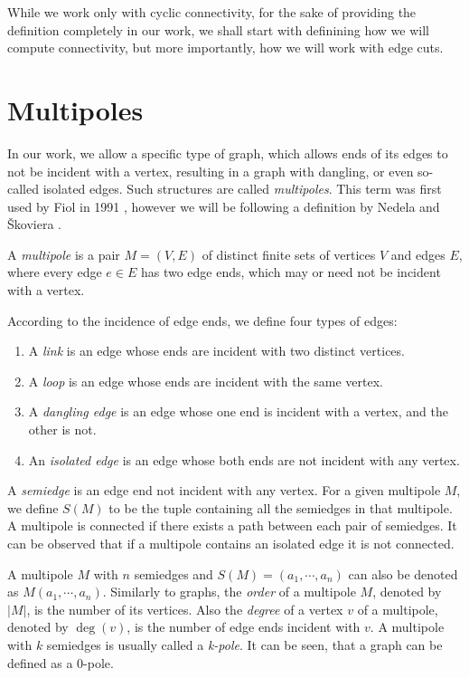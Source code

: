 \documentclass[12pt, twoside]{book}
\begin{document}
While we work only with cyclic connectivity, for the sake of providing the definition completely in our work, we shall start with definining how we will compute connectivity, but more importantly, how we will work with edge cuts.

\section{Multipoles}\label{sec:multipoles}

In our work, we allow a specific type of graph, which allows ends of its edges to not be incident with a vertex, resulting in a graph with dangling, or even so-called isolated edges. Such structures are called \textit{multipoles}. This term was first used by Fiol in 1991 \cite{Fiol1991}, however we will be following a definition by Nedela and Škoviera \cite{Nedela1996}.

\begin{definition}
	A \textit{multipole} is a pair $M=(V,E)$ of distinct finite sets of vertices $V$ and edges $E$, where every edge $e\in E$ has two edge ends, which may or need not be incident with a vertex.
	
	According to the incidence of edge ends, we define four types of edges:
	\begin{enumerate}[nolistsep]
		\item A \textit{link} is an edge whose ends are incident with two distinct vertices.
		\item A \textit{loop} is an edge whose ends are incident with the same vertex.
		\item A \textit{dangling edge} is an edge whose one end is incident with a vertex, and the other is not.
		\item An \textit{isolated edge} is an edge whose both ends are not incident with any vertex.
	\end{enumerate}
\end{definition}

A \textit{semiedge} is an edge end not incident with any vertex. For a given multipole $M$, we define $S(M)$ to be the tuple containing all the semiedges in that multipole. A multipole is connected if there exists a path between each pair of semiedges. It can be observed that if a multipole contains an isolated edge it is not connected.

A multipole $M$ with $n$ semiedges and $S(M) = (a_1, \cdots, a_n)$ can also be denoted as $M(a_1,\cdots,a_n)$. Similarly to graphs, the \textit{order} of a multipole $M$, denoted by $|M|$, is the number of its vertices. Also the \textit{degree} of a vertex $v$ of a multipole, denoted by $\deg(v)$, is the number of edge ends incident with $v$. A multipole with $k$ semiedges is usually called a \textit{k-pole}. It can be seen, that a graph can be defined as a 0-pole.
\end{document}
